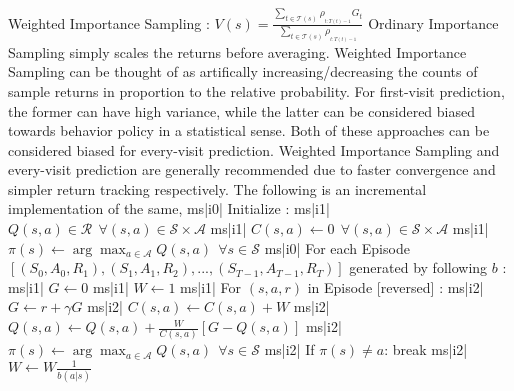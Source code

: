 Weighted Importance Sampling : \( V(s) = \frac{\sum_{t \in \mathcal{T}(s)} \rho_{_{t:T(t) - 1}} G_t}{ \sum_{t \in \mathcal{T}(s)} \rho_{_{t:T(t) - 1}} } \)
Ordinary Importance Sampling simply scales the returns before averaging. Weighted Importance Sampling can be thought of as artifically increasing/decreasing the counts of sample returns in proportion to the relative probability. For first-visit prediction, the former can have high variance, while the latter can be considered biased towards behavior policy in a statistical sense. Both of these approaches can be considered biased for every-visit prediction.
Weighted Importance Sampling and every-visit prediction are generally recommended due to faster convergence and simpler return tracking respectively. The following is an incremental implementation of the same,
ms|i0| Initialize :
ms|i1| \( Q(s, a) \in \mathcal{R} \ \ \forall (s,a) \in \mathcal{S} \times \mathcal{A} \)
ms|i1| \( C(s, a) \leftarrow 0 \ \ \forall (s, a) \in \mathcal{S} \times \mathcal{A} \)
ms|i1| \( \pi(s) \leftarrow \arg\max_{a \in \mathcal{A}} Q(s, a) \ \ \forall s \in \mathcal{S} \)
ms|i0| For each Episode \([(S_0, A_0, R_1), (S_1, A_1, R_2),..., (S_{T-1}, A_{T-1}, R_T)] \) generated by following \( b \) :
ms|i1| \( G \leftarrow 0 \)
ms|i1| \( W \leftarrow 1\)
ms|i1| For \( (s,a,r) \) in Episode [reversed] :
ms|i2| \( G \leftarrow r + \gamma G \)
ms|i2| \( C(s, a) \leftarrow C(s, a) + W \)
ms|i2| \( Q(s,a) \leftarrow Q(s, a) + \frac{W}{C(s, a)} [G - Q(s, a)] \)
ms|i2| \( \pi(s) \leftarrow \arg\max_{a \in \mathcal{A}} Q(s, a) \ \ \forall s \in \mathcal{S} \)
ms|i2| If \( \pi(s) \ne a \): break
ms|i2| \( W \leftarrow W \frac{1}{b(a|s)} \)